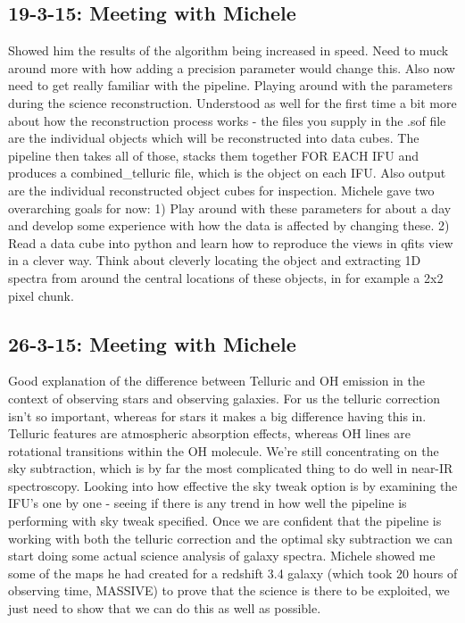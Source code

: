 \documentclass{literature}
\begin{document}
\subsection{19-3-15: Meeting with Michele}
Showed him the results of the algorithm being increased in speed. Need to muck around more with how adding a precision parameter would change this. Also now need to get really familiar with the pipeline. Playing around with the parameters during the science reconstruction. Understood as well for the first time a bit more about how the reconstruction process works - the files you supply in the .sof file are the individual objects which will be reconstructed into data cubes. The pipeline then takes all of those, stacks them together FOR EACH IFU and produces a combined_telluric file, which is the object on each IFU. Also output are the individual reconstructed object cubes for inspection. Michele gave two overarching goals for now: 1) Play around with these parameters for about a day and develop some experience with how the data is affected by changing these. 2) Read a data cube into python and learn how to reproduce the views in qfits view in a clever way. Think about cleverly locating the object and extracting 1D spectra from around the central locations of these objects, in for example a 2x2 pixel chunk. 

\subsection{26-3-15: Meeting with Michele}
Good explanation of the difference between Telluric and OH emission in the context of observing stars and observing galaxies. For us the telluric correction isn't so important, whereas for stars it makes a big difference having this in. Telluric features are atmospheric absorption effects, whereas OH lines are rotational transitions within the OH molecule. We're still concentrating on the sky subtraction, which is by far the most complicated thing to do well in near-IR spectroscopy. Looking into how effective the sky tweak option is by examining the IFU's one by one - seeing if there is any trend in how well the pipeline is performing with sky tweak specified. Once we are confident that the pipeline is working with both the telluric correction and the optimal sky subtraction we can start doing some actual science analysis of galaxy spectra. Michele showed me some of the maps he had created for a redshift 3.4 galaxy (which took 20 hours of observing time, MASSIVE) to prove that the science is there to be exploited, we just need to show that we can do this as well as possible.  
\end{document}
